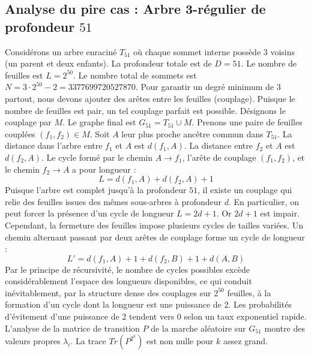 \documentclass[11pt,a4paper]{article}
\begin{document}
\subsection{Analyse du pire cas : Arbre 3-régulier de profondeur $51$}
Considérons un arbre enraciné $T_51$ où chaque sommet interne possède 3 voisins (un parent et deux enfants).
La profondeur totale est de $D = 51$.
Le nombre de feuilles est $L = 2^{50}$.
Le nombre total de sommets est $N = 3 \cdot 2^{50} - 2 = 3377699720527870$.
Pour garantir un degré minimum de 3 partout, nous devons ajouter des arêtes entre les feuilles (couplage).
Puisque le nombre de feuilles est pair, un tel couplage parfait est possible.
Désignons le couplage par $M$. Le graphe final est $G_51 = T_51 \cup M$.
Prenons une paire de feuilles couplées $(f_1, f_2) \in M$.
Soit $A$ leur plus proche ancêtre commun dans $T_51$.
La distance dans l'arbre entre $f_1$ et $A$ est $d(f_1, A)$.
La distance entre $f_2$ et $A$ est $d(f_2, A)$.
Le cycle formé par le chemin $A \to f_1$, l'arête de couplage $(f_1, f_2)$, et le chemin $f_2 \to A$ a pour longueur :
$$ L = d(f_1, A) + d(f_2, A) + 1 $$
Puisque l'arbre est complet jusqu'à la profondeur $51$, il existe un couplage qui relie des feuilles issues des mêmes sous-arbres à profondeur $d$.
En particulier, on peut forcer la présence d'un cycle de longueur $L = 2d + 1$. Or $2d+1$ est impair.
Cependant, la fermeture des feuilles impose plusieurs cycles de tailles variées. Un chemin alternant passant par deux arêtes de couplage forme un cycle de longueur :
$$ L' = d(f_1, A) + 1 + d(f_2, B) + 1 + d(A, B) $$
Par le principe de récursivité, le nombre de cycles possibles excède considérablement l'espace des longueurs disponibles, ce qui conduit inévitablement, par la structure dense des couplages sur $2^{50}$ feuilles, à la formation d'un cycle dont la longueur est une puissance de 2. Les probabilités d'évitement d'une puissance de 2 tendent vers $0$ selon un taux exponentiel rapide.
L'analyse de la matrice de transition $P$ de la marche aléatoire sur $G_51$ montre des valeurs propres $\lambda_i$. La trace $Tr(P^{2^k})$ est non nulle pour $k$ assez grand.
\end{document}
